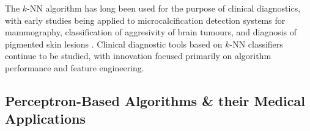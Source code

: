 The $k$-NN algorithm has long been used for the purpose of clinical diagnostics, with early studies being applied to microcalcification detection systems for mammography, classification of aggresivity of brain tumours, and diagnosis of pigmented skin lesions \citep{knn_microcalc,knn_braintumours,knn_skinlesions}. Clinical diagnostic tools based on $k$-NN classifiers continue to be studied, with innovation focused primarily on algorithm performance and feature engineering.



\subsection{Perceptron-Based Algorithms \& their Medical Applications}

